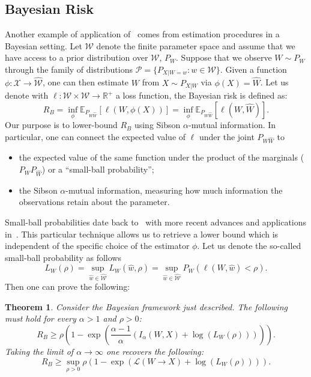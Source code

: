 \documentclass{article}
\newtheorem{theorem}{Theorem}
\numberwithin{theorem}{section}
\numberwithin{example}{section}
\numberwithin{remark}{section}
\numberwithin{definition}{section}
\newcommand{\ml}[2]{\mathcal{L}\left(#1  \!\!  \to  \!\!   #2\right)} %
\newcommand{\revised}[1]{{\color{black} #1}}
\begin{document}
\subsection{Bayesian Risk}\label{sec:bayesianRisk}
\label{sec:bayesianFramework}
	Another example of application of~ comes from estimation procedures in a Bayesian setting. Let $\mathcal{W}$ denote the \revised{finite} parameter space and assume that we have access to a prior distribution over $\mathcal{W}$, $P_W$. Suppose that we observe $W\sim P_W$ through the family of distributions $\mathcal{P}= \{ P_{X|W=w}: w\in\mathcal{W} \}.$ Given a function $\phi:\mathcal{X}\to\hat{\mathcal{W}}$, one can then estimate $W$ from $X\sim P_{X|W}$ via $\phi(X)=\hat{W}$. Let us denote with $\ell:\mathcal{W}\times\hat{\mathcal{W}}\to \mathbb{R}^+$ a loss function, the Bayesian risk is defined as:
	\begin{equation}
		R_B= \inf_\phi \mathbb{E}_{P_{W\hat{W}}}[\ell(W,\phi(X))] = \inf_\phi\mathbb{E}_{P_{W\hat{W}}}[\ell(W,\hat{W})].\label{risk}
	\end{equation}
	Our purpose is to lower-bound $R_B$ using Sibson $\alpha$-mutual information. In particular, one can connect the expected value of $\ell$ under the joint $P_{W\hat{W}}$ to 
	\begin{itemize}
		\item the  expected value of the same function under the product of the marginals ($P_WP_{\hat{W}}$) or a ``small-ball probability'';
		\item the Sibson $\alpha$-mutual information, measuring how much information the observations retain about the parameter. 
	\end{itemize}
    \revised{Small-ball probabilities date back to~\cite{KuelbsLi:93} with more recent advances and applications in~\cite{Li:99,Bobkov:15, Xu:17}.}
	This particular technique allows us to retrieve a lower bound which is independent of the specific choice of the estimator $\phi$. 
	Let us denote the so-called small-ball probability  as follows
 \begin{equation}L_W(\rho)= \sup_{\hat{w}\in\mathcal{\hat{W}}} L_W(\hat{w},\rho) =  \sup_{\hat{w}\in\mathcal{\hat{W}}}P_W(\ell(W,\hat{w})< \rho).\label{smallBall}\end{equation}
 Then one can prove the following:
 	\begin{theorem}\label{thm:sibsMIResultBayesRisk}
		Consider the Bayesian framework just described. The following must hold for every $\alpha>1$ and $\rho>0$:
		\begin{equation}
			R_B\geq \rho\left(1- \exp\left(\frac{\alpha-1}{\alpha}\left(I_\alpha(W,X) + \log(L_W(\rho))\right) \right)\right). \label{eq:sibsMILowerBound}
    \end{equation}
    Taking the limit of $\alpha\to \infty$ one recovers the following:
    \begin{equation}
			R_B\geq \sup_{\rho>0}\rho\left(1- \exp\left(\ml{W}{X} + \log(L_W(\rho)) \right)\right). \label{eq:maximalLeakgeResultBayesRisk}
		\end{equation}
\end{theorem}
\end{document}
